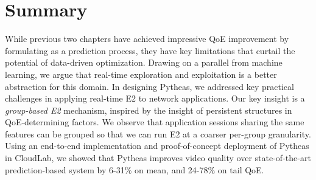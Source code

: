 













%



\section{Summary}
\label{sec:pytheas:summary}

While previous two chapters
have achieved impressive QoE improvement by formulating \ddn as a 
prediction process, they have key limitations
that curtail the potential of data-driven optimization.
Drawing on a parallel from machine learning, we
argue that real-time exploration and exploitation is a better
abstraction for this domain. In designing Pytheas, we
addressed key practical challenges in applying real-time
E2 to network applications. Our key insight is a {\em group-based
E2} mechanism, inspired by the insight of persistent structures in
QoE-determining factors. We observe that application sessions sharing
the same features can be grouped so that we can run
E2 at a coarser per-group granularity. Using an end-to-end
implementation and proof-of-concept deployment of
Pytheas in CloudLab, we showed that Pytheas improves
video quality over state-of-the-art prediction-based system
by 6-31\% on mean, and 24-78\% on tail QoE.




